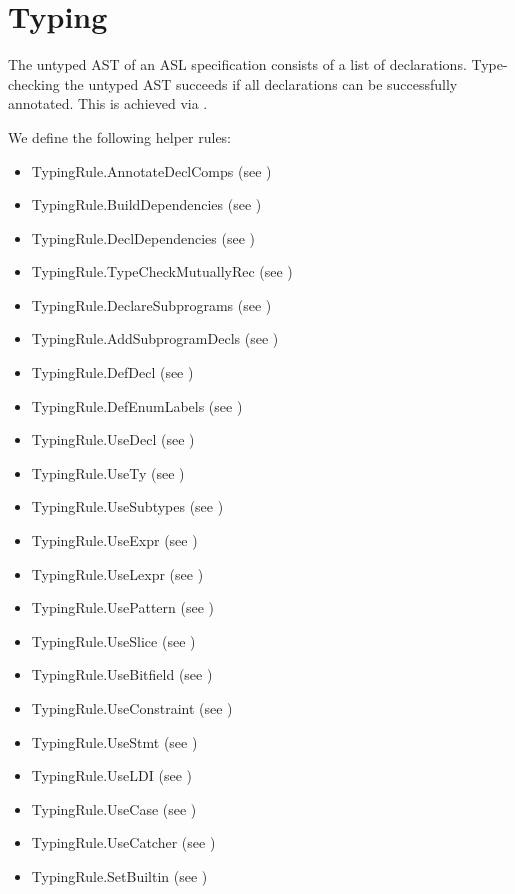 \section{Typing}

The untyped AST of an ASL specification consists of a list of declarations.
Type-checking the untyped AST succeeds if all declarations can be successfully annotated.
This is achieved via .

We define the following helper rules:
\begin{itemize}
  \item TypingRule.AnnotateDeclComps (see )
  \item TypingRule.BuildDependencies (see )
  \item TypingRule.DeclDependencies (see )
  \item TypingRule.TypeCheckMutuallyRec (see )
  \item TypingRule.DeclareSubprograms (see )
  \item TypingRule.AddSubprogramDecls (see )
  \item TypingRule.DefDecl (see )
  \item TypingRule.DefEnumLabels (see )
  \item TypingRule.UseDecl (see )
  \item TypingRule.UseTy (see )
  \item TypingRule.UseSubtypes (see )
  \item TypingRule.UseExpr (see )
  \item TypingRule.UseLexpr (see )
  \item TypingRule.UsePattern (see )
  \item TypingRule.UseSlice (see )
  \item TypingRule.UseBitfield (see )
  \item TypingRule.UseConstraint (see )
  \item TypingRule.UseStmt (see )
  \item TypingRule.UseLDI (see )
  \item TypingRule.UseCase (see )
  \item TypingRule.UseCatcher (see )
  \item TypingRule.SetBuiltin (see )
\end{itemize}

